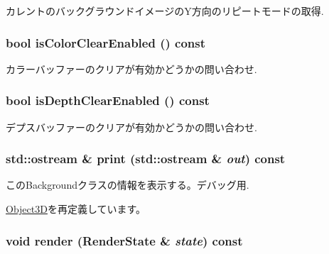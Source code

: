 カレントのバックグラウンドイメージのY方向のリピートモードの取得. \hypertarget{classm3g_1_1Background_d6b7bfdf4225b509549e2fbb9575b509}{
\subsubsection[{isColorClearEnabled}]{\setlength{\rightskip}{0pt plus 5cm}bool isColorClearEnabled () const}}
\label{classm3g_1_1Background_d6b7bfdf4225b509549e2fbb9575b509}


カラーバッファーのクリアが有効かどうかの問い合わせ. \hypertarget{classm3g_1_1Background_d20a03183cd1c6418dcadf94ac0ca470}{
\subsubsection[{isDepthClearEnabled}]{\setlength{\rightskip}{0pt plus 5cm}bool isDepthClearEnabled () const}}
\label{classm3g_1_1Background_d20a03183cd1c6418dcadf94ac0ca470}


デプスバッファーのクリアが有効かどうかの問い合わせ. \hypertarget{classm3g_1_1Background_6fea17fa1532df3794f8cb39cb4f911f}{
\subsubsection[{print}]{\setlength{\rightskip}{0pt plus 5cm}std::ostream \& print (std::ostream \& {\em out}) const}}
\label{classm3g_1_1Background_6fea17fa1532df3794f8cb39cb4f911f}


このBackgroundクラスの情報を表示する。デバッグ用. 

\hyperlink{classm3g_1_1Object3D_6fea17fa1532df3794f8cb39cb4f911f}{Object3D}を再定義しています。\hypertarget{classm3g_1_1Background_8babc8a79b78615da51161e94029eea9}{
\subsubsection[{render}]{\setlength{\rightskip}{0pt plus 5cm}void render ({\bf RenderState} \& {\em state}) const}}
\label{classm3g_1_1Background_8babc8a79b78615da51161e94029eea9}



